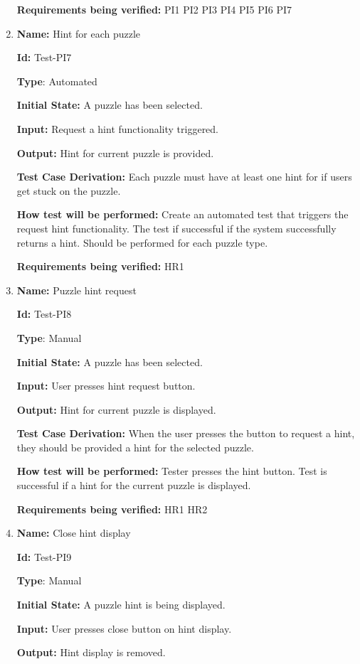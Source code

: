\documentclass[12pt, titlepage]{article}
\begin{document}
\begin{enumerate}
\textbf{Requirements being verified: } PI1 PI2 PI3 PI4 PI5 PI6 PI7

\item{\textbf{Name:} Hint for each puzzle}

\textbf{Id:} Test-PI7

\textbf{Type}: Automated

\textbf{Initial State:} A puzzle has been selected.

\textbf{Input:} Request a hint functionality triggered.

\textbf{Output:} Hint for current puzzle is provided.

\textbf{Test Case Derivation:}
Each puzzle must have at least one hint for if users get stuck on the puzzle.

\textbf{How test will be performed:}
Create an automated test that triggers the request hint functionality. The test if successful if the system successfully returns a hint. Should be performed for each puzzle type.

\textbf{Requirements being verified: } HR1

\item{\textbf{Name:} Puzzle hint request}

\textbf{Id:} Test-PI8

\textbf{Type}: Manual

\textbf{Initial State:} A puzzle has been selected.

\textbf{Input:} User presses hint request button.

\textbf{Output:} Hint for current puzzle is displayed.

\textbf{Test Case Derivation:}
When the user presses the button to request a hint, they should be provided a hint for the selected puzzle.

\textbf{How test will be performed:}
Tester presses the hint button. Test is successful if a hint for the current puzzle is displayed.

\textbf{Requirements being verified: } HR1 HR2

\item{\textbf{Name:} Close hint display}

\textbf{Id:} Test-PI9

\textbf{Type}: Manual

\textbf{Initial State:} A puzzle hint is being displayed.

\textbf{Input:} User presses close button on hint display.

\textbf{Output:} Hint display is removed.


\end{enumerate}
\end{document}
